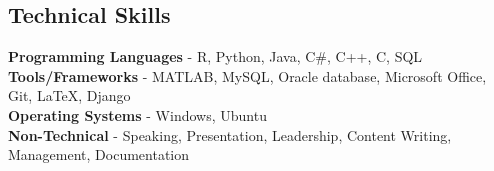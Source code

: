 \documentclass[margin, centered]{res}
\begin{document}
\begin{resume}
\section{Technical \hspace{2mm} Skills}
\textbf{Programming Languages }- R, Python, Java, C\#, C++, C, SQL\\
\textbf{Tools/Frameworks }- MATLAB, MySQL, Oracle database, Microsoft Office, Git, \LaTeX, Django\\
\textbf{Operating Systems } - Windows, Ubuntu\\
\textbf{Non-Technical } - Speaking, Presentation, Leadership, Content Writing, Management, Documentation



\end{resume}
\end{document}
